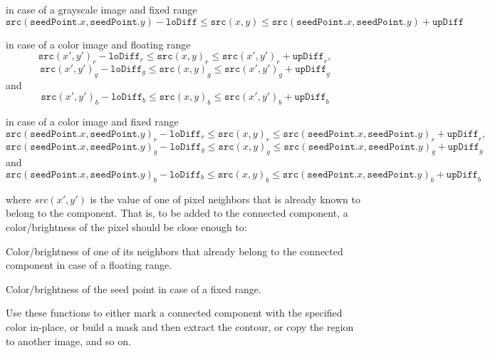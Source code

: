 \begin{DoxyItemize}
\item in case of a grayscale image and fixed range \[\texttt{src} ( \texttt{seedPoint} .x, \texttt{seedPoint} .y)- \texttt{loDiff} \leq \texttt{src} (x,y) \leq \texttt{src} ( \texttt{seedPoint} .x, \texttt{seedPoint} .y)+ \texttt{upDiff}\] 
\end{DoxyItemize}


\begin{DoxyItemize}
\item in case of a color image and floating range \[\texttt{src} (x',y')_r- \texttt{loDiff} _r \leq \texttt{src} (x,y)_r \leq \texttt{src} (x',y')_r+ \texttt{upDiff} _r,\] \[\texttt{src} (x',y')_g- \texttt{loDiff} _g \leq \texttt{src} (x,y)_g \leq \texttt{src} (x',y')_g+ \texttt{upDiff} _g\] and \[\texttt{src} (x',y')_b- \texttt{loDiff} _b \leq \texttt{src} (x,y)_b \leq \texttt{src} (x',y')_b+ \texttt{upDiff} _b\] 
\end{DoxyItemize}


\begin{DoxyItemize}
\item in case of a color image and fixed range \[\texttt{src} ( \texttt{seedPoint} .x, \texttt{seedPoint} .y)_r- \texttt{loDiff} _r \leq \texttt{src} (x,y)_r \leq \texttt{src} ( \texttt{seedPoint} .x, \texttt{seedPoint} .y)_r+ \texttt{upDiff} _r,\] \[\texttt{src} ( \texttt{seedPoint} .x, \texttt{seedPoint} .y)_g- \texttt{loDiff} _g \leq \texttt{src} (x,y)_g \leq \texttt{src} ( \texttt{seedPoint} .x, \texttt{seedPoint} .y)_g+ \texttt{upDiff} _g\] and \[\texttt{src} ( \texttt{seedPoint} .x, \texttt{seedPoint} .y)_b- \texttt{loDiff} _b \leq \texttt{src} (x,y)_b \leq \texttt{src} ( \texttt{seedPoint} .x, \texttt{seedPoint} .y)_b+ \texttt{upDiff} _b\] 
\end{DoxyItemize}

where $src(x',y')$ is the value of one of pixel neighbors that is already known to belong to the component. That is, to be added to the connected component, a color/brightness of the pixel should be close enough to\+:
\begin{DoxyItemize}
\item Color/brightness of one of its neighbors that already belong to the connected component in case of a floating range.
\item Color/brightness of the seed point in case of a fixed range. 
\end{DoxyItemize}

Use these functions to either mark a connected component with the specified color in-\/place, or build a mask and then extract the contour, or copy the region to another image, and so on. 



